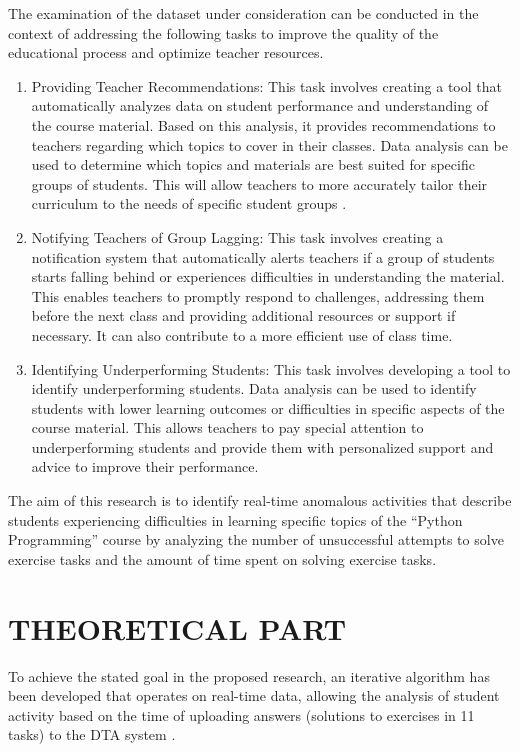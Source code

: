 \documentclass{article}
\begin{document}
\begin{multicols}{2}
\begin{justify}
      The examination of the dataset under consideration can be conducted in the context of addressing the following tasks to improve the quality of the educational process and optimize teacher resources.

      \begin{enumerate}
        \item	Providing Teacher Recommendations: This task involves creating a tool that automatically analyzes data on student performance and understanding of the course material. Based on this analysis, it provides recommendations to teachers regarding which topics to cover in their classes. Data analysis can be used to determine which topics and materials are best suited for specific groups of students. This will allow teachers to more accurately tailor their curriculum to the needs of specific student groups \cite{11}.
        \item	Notifying Teachers of Group Lagging: This task involves creating a notification system that automatically alerts teachers if a group of students starts falling behind or experiences difficulties in understanding the material. This enables teachers to promptly respond to challenges, addressing them before the next class and providing additional resources or support if necessary. It can also contribute to a more efficient use of class time.
        \item	Identifying Underperforming Students: This task involves developing a tool to identify underperforming students. Data analysis can be used to identify students with lower learning outcomes or difficulties in specific aspects of the course material. This allows teachers to pay special attention to underperforming students and provide them with personalized support and advice to improve their performance.
      \end{enumerate}
      The aim of this research is to identify real-time anomalous activities that describe students experiencing difficulties in learning specific topics of the “Python Programming” course by analyzing the number of unsuccessful attempts to solve exercise tasks and the amount of time spent on solving exercise tasks.
      \section{THEORETICAL PART}
      To achieve the stated goal in the proposed research, an iterative algorithm has been developed that operates on real-time data, allowing the analysis of student activity based on the time of uploading answers (solutions to exercises in 11 tasks) to the DTA system \cite{15}.


\end{justify}
\end{multicols}
\end{document}
